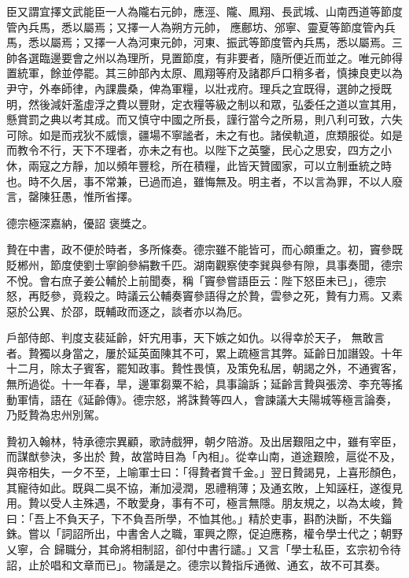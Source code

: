 \begin{pinyinscope}
 臣又謂宜擇文武能臣一人為隴右元帥，應涇、隴、鳳翔、長武城、山南西道等節度管內兵馬，悉以屬焉；又擇一人為朔方元帥，
 應鄜坊、邠寧、靈夏等節度管內兵馬，悉以屬焉；又擇一人為河東元帥，河東、振武等節度管內兵馬，悉以屬焉。三帥各選臨邊要會之州以為理所，見置節度，有非要者，隨所便近而並之。唯元帥得置統軍，餘並停罷。其三帥部內太原、鳳翔等府及諸郡戶口稍多者，慎揀良吏以為尹守，外奉師律，內課農桑，俾為軍糧，以壯戎府。理兵之宜既得，選帥之授既明，然後減奸濫虛浮之費以豐財，定衣糧等級之制以和眾，弘委任之道以宣其用，
 懸賞罰之典以考其成。而又慎守中國之所長，謹行當今之所易，則八利可致，六失可除。如是而戎狄不威懷，疆場不寧謐者，未之有也。諸侯軌道，庶類服從。如是而教令不行，天下不理者，亦未之有也。以陛下之英鑒，民心之思安，四方之小休，兩寇之方靜，加以頻年豐稔，所在積糧，此皆天贊國家，可以立制垂統之時也。時不久居，事不常兼，已過而追，雖悔無及。明主者，不以言為罪，不以人廢言，罄陳狂愚，惟所省擇。



 德宗極深嘉納，優詔
 褒獎之。



 贄在中書，政不便於時者，多所條奏。德宗雖不能皆可，而心頗重之。初，竇參既貶郴州，節度使劉士寧餉參絹數千匹。湖南觀察使李巽與參有隙，具事奏聞，德宗不悅。會右庶子姜公輔於上前聞奏，稱「竇參嘗語臣云：陛下怒臣未已」，德宗怒，再貶參，竟殺之。時議云公輔奏竇參語得之於贄，雲參之死，贄有力焉。又素惡於公異、於邵，既輔政而逐之，談者亦以為厄。



 戶部侍郎、判度支裴延齡，奸宄用事，天下嫉之如仇。以得幸於天子，
 無敢言者。贄獨以身當之，屢於延英面陳其不可，累上疏極言其弊。延齡日加譖毀。十年十二月，除太子賓客，罷知政事。贄性畏慎，及策免私居，朝謁之外，不通賓客，無所過從。十一年春，旱，邊軍芻粟不給，具事論訴；延齡言贄與張滂、李充等搖動軍情，語在《延齡傳》。德宗怒，將誅贄等四人，會諫議大夫陽城等極言論奏，乃貶贄為忠州別駕。



 贄初入翰林，特承德宗異顧，歌詩戲狎，朝夕陪游。及出居艱阻之中，雖有宰臣，而謀猷參決，多出於
 贄，故當時目為「內相」。從幸山南，道途艱險，扈從不及，與帝相失，一夕不至，上喻軍士曰：「得贄者賞千金。」翌日贄謁見，上喜形顏色，其寵待如此。既與二吳不協，漸加浸潤，恩禮稍薄；及通玄敗，上知誣枉，遂復見用。贄以受人主殊遇，不敢愛身，事有不可，極言無隱。朋友規之，以為太峻，贄曰：「吾上不負天子，下不負吾所學，不恤其他。」精於吏事，斟酌決斷，不失錙銖。嘗以「詞詔所出，中書舍人之職，軍興之際，促迫應務，權令學士代之；朝野乂寧，合
 歸職分，其命將相制詔，卻付中書行譴。」又言「學士私臣，玄宗初令待詔，止於唱和文章而已」。物議是之。德宗以贄指斥通微、通玄，故不可其奏。




\end{pinyinscope}
